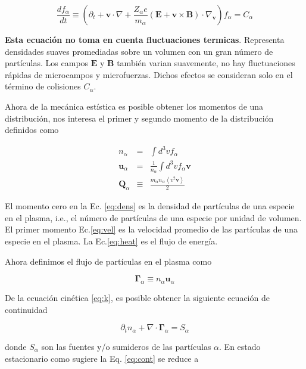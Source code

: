 \documentclass[11pt]{article}
\theoremstyle{definition}
\begin{document}
  \begin{equation}\label{eq:k}
    \frac{df_\alpha}{dt} \equiv \left(\partial_t + \textbf{v}\cdot\nabla + \frac{Z_\alpha e}{m_\alpha}(\textbf{E} + \textbf{v}\times\textbf{B})\cdot \nabla_\textbf{v} \right)f_\alpha = C_\alpha
  \end{equation}

  \textbf{Esta ecuaci\'on no toma en cuenta fluctuaciones termicas}. Representa densidades suaves promediadas sobre un volumen con un gran n\'umero de part\'iculas. Los campos $\textbf{E}$ y $\textbf{B}$ tambi\'en varian suavemente, no hay fluctuaciones r\'apidas de microcampos y microfuerzas. Dichos efectos se consideran solo en el t\'ermino de colisiones $C_\alpha$.

  Ahora de la mec\'anica est\'istica es posible obtener los momentos de una distribuci\'on, nos interesa el primer y segundo momento\cite{helander2005} de la distribuci\'on definidos como 

  \begin{eqnarray}
    n_\alpha &=& \int d^3v f_\alpha \label{eq:dens}\\
    \textbf{u}_{\alpha} &=& \frac{1}{n_\alpha}\int d^3v f_\alpha\textbf{v} \label{eq:vel} \\
    \textbf{Q}_\alpha &\equiv& \frac{m_\alpha n_\alpha \left<v^2\textbf{v}\right>}{2}\label{eq:heat}
  \end{eqnarray}

El momento cero en la Ec. \eqref{eq:dens} es la densidad de part\'iculas de una especie en el plasma, i.e., el n\'umero de part\'iculas de una especie por unidad de volumen. El primer momento Ec.\eqref{eq:vel} es la velocidad promedio de las part\'iculas de una especie en el plasma. La Ec.\eqref{eq:heat} es el flujo de energ\'ia. 

  Ahora definimos el flujo de part\'iculas en el plasma como 
  
  \begin{equation}
    \pmb{\Gamma}_\alpha \equiv n_\alpha\textbf{u}_\alpha
  \end{equation}

  De la ecuaci\'on cin\'etica \eqref{eq:k}, es posible obtener la siguiente ecuaci\'on de continuidad

  \begin{equation}\label{eq:cont}
    \partial_t n_\alpha + \nabla\cdot\pmb{\Gamma}_\alpha = S_\alpha
  \end{equation}

  donde $S_\alpha$ son las fuentes y/o sumideros de las part\'iculas $\alpha$. En estado estacionario como sugiere \cite{lechte2002} la Eq. \eqref{eq:cont} se reduce a 
\end{document}
